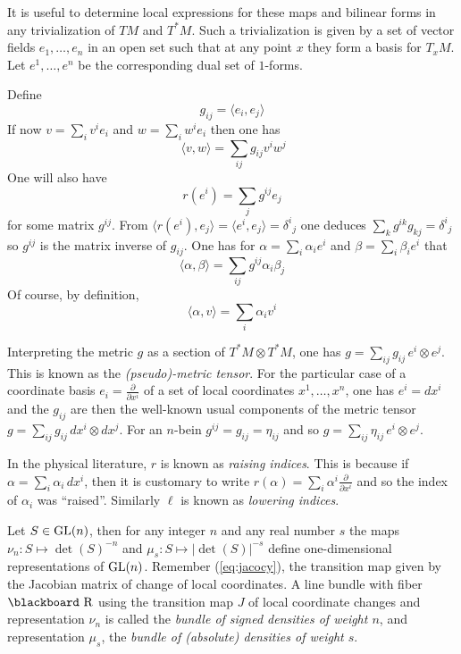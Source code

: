 \documentclass[12pt,titlepage]{article}
\def\bbf#1{\hbox{\blackboard #1}}
\def\lR{\bbf R}
\def\GL{\hbox{GL}}
\def\ppv#1#2{\frac{\partial}{\partial #1^#2}}
\begin{document}
It is useful to determine local expressions for these maps and bilinear
forms in any  trivialization of \(TM\) and \(T^*M\).  Such a 
trivialization is given by a set of vector fields \(e_1,\dots,e_n\) in an 
open set such that at any point \(x\) they form a basis for \(T_xM\). Let 
\(e^1,\dots,e^n\) be the corresponding dual set of \(1\)-forms. 

Define
\[
g_{ij} = \langle e_i,e_j \rangle
\]
%
If now \(v=\sum_i v^ie_i\) and \(w = \sum_iw^ie_i\) then
one has 
\[
\ \langle v,w \rangle = \sum_{ij}g_{ij}v^iw^j
\]
 One will also have 
\[
r(e^i)
= \sum_j g^{ij}e_j
\]
 for some matrix \(g^{ij}\).
% 
From \(\langle r(e^i),e_j \rangle = \langle e^i,e_j \rangle = \delta^i{}_j\)
 one deduces \(\sum_k g^{ik}g_{kj} = \delta^i{}_j\)
so \(g^{ij}\) is the matrix inverse
of \(g_{ij}\). One has for \(\alpha = \sum_i\alpha_ie^i\) and \(\beta =
\sum_i\beta_ie^i\) that 
\[
\langle\alpha,\beta\rangle =
\sum_{ij}g^{ij}\alpha_i\beta_j
\]
 Of course, by definition, 
\[
\langle\alpha,v\rangle =
\sum_i\alpha_iv^i
\]

Interpreting the metric \(g\) as a section of \(T^*M\otimes T^*M\), one has
\(g=\sum_{ij}g_{ij}\,e^i\otimes e^j\). This is known as the 
{\em (pseudo)-metric tensor\/}. 
%
For the particular case of a coordinate basis \(e_i = \ppv{x}{i}\) 
of a set 
of local coordinates \(x^1,\dots,x^n\),
  one has \(e^i=dx^i\) and the \(g_{ij}\) are then the well-known usual
components of the  metric tensor
 \(g=\sum_{ij}g_{ij}\,dx^i\otimes dx^j\). For 
an \(n\)-bein \(g^{ij}=g_{ij}=\eta_{ij}\) 
and so \(g=\sum_{ij}\eta_{ij}\,e^i\otimes e^j\).

In the physical literature, \(r\)  is known as {\em
raising indices\/}.
%
 This is because if
\(\alpha=\sum_i\alpha_i\,dx^i\), then it is customary to write
\(r(\alpha) = \sum_i\alpha^i\ppv{x}{i}\) and so the index of
\(\alpha_i\) was ``raised''. Similarly \(\ell\) is known as 
%
{\em lowering
indices\/}.

Let \(S\in \GL(n)\), then for any integer \(n\) and any real number
\(s\) the maps \(\nu_n : S \mapsto \det (S)^{-n}\) and \(\mu_s:S
\mapsto |\det (S)|^{-s}\) define one-dimensional representations of
\(\GL(n)\). 
Remember (\ref{eq:jacocy}), the transition map given by the
Jacobian matrix of change of local coordinates.
A line bundle with fiber \(\lR\) using the transition map
\(J\) of local coordinate changes and representation \(\nu_n\) is called
the {\em bundle of signed
densities of weight \(n\)\/},
%
%
 and representation \(\mu_s\), the {\em
bundle of (absolute) densities of weight \(s\)\/}.
%
%
\end{document}
